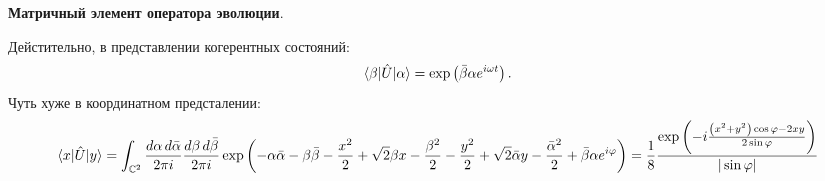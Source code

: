 \textbf{Матричный элемент оператора эволюции}. 

Дейстительно, в представлении когерентных состояний:
\begin{equation*}
    \bk{\beta}[\hat{U}]{\alpha} = \exp\left(\bar{\beta} \alpha e^{i \omega t}\right).
\end{equation*}
Чуть хуже в координатном предсталении:
\begin{equation*}
\langle x | \hat{U}| y\rangle = 
    \int_{\mathbb{C}^2} \frac{ d\alpha \, d \bar{\alpha}}{2 \pi i} \frac{ d\beta \, d \bar{\beta}}{2 \pi i}  \exp\left(
        - \alpha \bar{\alpha} - \beta \bar{\beta} - \frac{x^2}{2} + \sqrt{2} \beta x - \frac{\beta^2}{2} - \frac{y^2}{2} + \sqrt{2} \bar{\alpha} y - \frac{\bar{\alpha}^2}{2} + \bar{\beta} \alpha e^{i \varphi}
    \right)
    = \frac{1}{8}
    \frac{\exp \left(- i\frac{  \left(x^2+y^2\right)\cos \varphi -2 x y}{2 \sin \varphi }\right)}{| \sin \varphi | }
\end{equation*}
